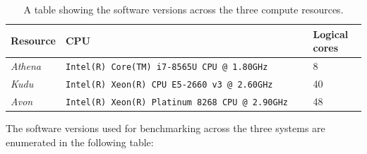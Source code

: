 \begin{table}[H]
    \caption{A table showing the software versions across the three compute resources.}
    \label{table:perfTools}
    \begin{tabular}{|p{0.15\linewidth}||p{0.7\linewidth}|p{0.15\linewidth}|}
    \hline
    \textbf{Resource} & \textbf{CPU}                                            & \textbf{Logical cores} \\ \hline\hline
    \textit{Athena}   & \texttt{Intel(R) Core(TM) i7-8565U CPU @ 1.80GHz}     & 8                      \\ \hline
    \textit{Kudu}     & \texttt{Intel(R) Xeon(R) CPU E5-2660 v3 @ 2.60GHz}    & 40                     \\ \hline
    \textit{Avon}     & \texttt{Intel(R) Xeon(R) Platinum 8268 CPU @ 2.90GHz} & 48                     \\ \hline
    \end{tabular}
\end{table}

The software versions used for benchmarking across the three systems are enumerated in the following table:

